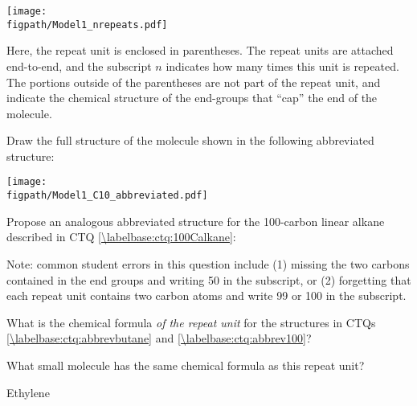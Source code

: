 \begin{activity}
\begin{infobox}
	\centerline{\texttt{[image: \\figpath/Model1\_nrepeats.pdf]}}
	
	Here, the repeat unit is enclosed in parentheses.  The repeat units are attached end-to-end, and the subscript $n$ indicates how many times this unit is repeated.  The portions outside of the parentheses are not part of the repeat unit, and indicate the chemical structure of the end-groups that ``cap'' the end of the molecule.
\end{infobox}

\begin{ctqs}
	\question Draw the full structure of the molecule shown in the following abbreviated structure: \label{\labelbase:ctq:abbrevbutane}
	
		\vspace{6pt}
		\centerline{\texttt{[image: \\figpath/Model1\_C10\_abbreviated.pdf]}}
		
		\begin{solution}[1.25in]
		\end{solution}
	
	\question Propose an analogous abbreviated structure for the 100-carbon linear alkane described in CTQ \ref{\labelbase:ctq:100Calkane}: \label{\labelbase:ctq:abbrev100}
		
		\begin{solution}[0.75in]
			Note: common student errors in this question include (1) missing the two carbons contained in the end groups and writing 50 in the subscript, or (2) forgetting that each repeat unit contains two carbon atoms and write 99 or 100 in the subscript.
		\end{solution}
	
	\question What is the chemical formula \emph{of the repeat unit} for the structures in CTQs \ref{\labelbase:ctq:abbrevbutane} and \ref{\labelbase:ctq:abbrev100}?
		
		\begin{solution}[0.75in]
		\end{solution}
	
	\question What small molecule has the same chemical formula as this repeat unit?
		
		\begin{solution}[0.75in]
			Ethylene
			

\end{solution}
\end{ctqs}
\end{activity}
